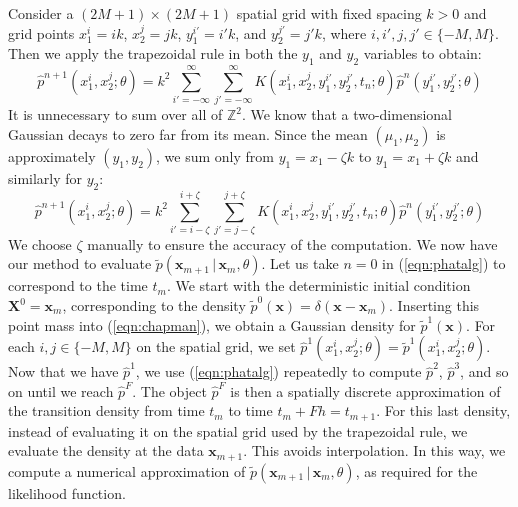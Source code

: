 \documentclass[graybox]{svmult}
\begin{document}
Consider a $(2M+1) \times (2M+1)$ spatial grid with fixed spacing $k > 0$ and grid points $x_1^i = ik$, $x_2^j = jk$, $y_1^{i'} = i'k$, and $y_2^{j'} = j'k$, where $i, i', j, j' \in \{-M, M\}$. Then we apply the trapezoidal rule in both the $y_1$ and $y_2$ variables to obtain:
\begin{equation}
\hat{p}^{n+1}(x_1^i, x_2^j ;\theta) = k^2 \sum\limits_{i' = -\infty}^{\infty} \sum\limits_{j' = -\infty}^{\infty} K(x_1^i, x_2^j, y_1^{i'}, y_2^{j'},t_n; \theta)  \hat{p}^n(y_1^{i'}, y_2^{j'}; \theta)
\end{equation}
It is unnecessary to sum over all of $\mathbb{Z}^2$.  We know that a two-dimensional Gaussian decays to zero far from its mean.  Since the mean $(\mu_1,\mu_2)$ is approximately $(y_1,y_2)$, we sum only from $y_1 = x_1 - \zeta k$ to $y_1 = x_1 + \zeta k$ and similarly for $y_2$:
\begin{equation}
\label{eqn:phatalg}
\hat{p}^{n+1}(x_1^i, x_2^j;\theta ) = k^2 \sum\limits_{i' = i - \zeta}^{i+ \zeta} \sum\limits_{j' = j-\zeta}^{j+\zeta} K(x_1^i, x_2^j, y_1^{i'}, y_2^{j'},t_n; \theta) \hat{p}^n(y_1^{i'}, y_2^{j'}; \theta)
\end{equation}
We choose $\zeta$ manually to ensure the accuracy of the computation.
We now have our method to evaluate $\widetilde{p}(\mathbf{x}_{m+1} \, | \, \mathbf{x}_m, \theta)$.  Let us take $n=0$ in (\ref{eqn:phatalg}) to correspond to the time $t_m$.  We start with the deterministic initial condition $\mathbf{X}^0 = \mathbf{x}_m$, corresponding to the density $\widetilde{p}^0(\mathbf{x}) = \delta(\mathbf{x} - \mathbf{x}_m)$.  Inserting this point mass into (\ref{eqn:chapman}), we obtain a Gaussian density for $\widetilde{p}^1(\mathbf{x})$.  For each $i,j \in \{-M, M\}$ on the spatial grid, we set $\hat{p}^1(x_1^i, x_2^j; \theta) = \widetilde{p}^1(x_1^i, x_2^j; \theta)$.
Now that we have $\hat{p}^1$, we use (\ref{eqn:phatalg}) repeatedly to
compute $\hat{p}^2$, $\hat{p}^3$, and so on until we reach
$\hat{p}^F$.  The object $\hat{p}^F$ is then a spatially discrete
approximation of the transition density from time $t_m$ to time $t_m +
Fh = t_{m+1}$.  For this last density, instead of evaluating it on the
spatial grid used by the trapezoidal rule, we evaluate the density at
the data $\mathbf{x}_{m+1}$.  This avoids interpolation.  In this way,
we compute a numerical approximation of $\widetilde{p}(\mathbf{x}_{m+1} \, | \, \mathbf{x}_m, \theta)$, as required for the likelihood function.
\end{document}
